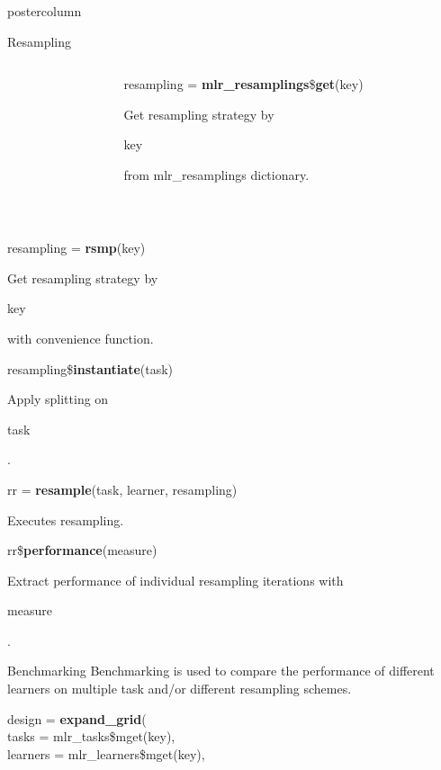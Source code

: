 \documentclass{beamer}
\newcommand{\codeinline}[1]{\begin{codeboxinline}#1\end{codeboxinline}}
\begin{document}
\begin{frame}[fragile]{}
\begin{columns}
\begin{column}{.245\textwidth}
\begin{beamercolorbox}[center]{postercolumn}
\begin{minipage}{.98\textwidth}
{\begin{myblock}{Resampling}
\begin{minipage}{\textwidth}
\begin{columns}[T]
									\begin{column}{0.01\textwidth}
									\end{column}
									\begin{column}{0.79\textwidth}
										\begin{codebox}
											resampling = \textbf{mlr\_resamplings}\$\textbf{get}(key)
										\end{codebox}
										Get resampling strategy by \codeinline{key} from mlr\_resamplings dictionary.
									\end{column}
								\end{columns}
							\end{minipage}
							\\[\baselineskip]
							\begin{codebox}
								resampling = \textbf{rsmp}(key)
							\end{codebox}
							Get resampling strategy by \codeinline{key} with convenience function.
							\\
							\begin{codebox}
								resampling\$\textbf{instantiate}(task)
							\end{codebox}
							Apply splitting on \codeinline{task}.
							\\
							\begin{codebox}
								rr = \textbf{resample}(task, learner, resampling)
							\end{codebox}
							Executes resampling.
							\\
							\begin{codebox}
								rr\$\textbf{performance}(measure)
							\end{codebox}
							Extract performance of individual resampling iterations with \codeinline{measure}.
						\end{myblock}
						\begin{myblock}{Benchmarking}
							Benchmarking is used to compare the performance of different learners on multiple task and/or different resampling schemes.
							\\
							\begin{codeboxmultiline}[width=21.95cm]
								design = \textbf{expand\_grid}(\\
								\hspace*{1ex}tasks = mlr\_tasks\$mget(key),\\
								\hspace*{1ex}learners = mlr\_learners\$mget(key),\\

\end{codeboxmultiline}
\end{myblock}}
\end{minipage}
\end{beamercolorbox}
\end{column}
\end{columns}
\end{frame}
\end{document}
